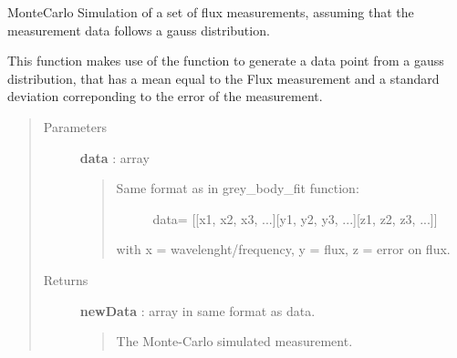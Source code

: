 \documentclass[a4paper,10pt,english]{sphinxmanual}
\begin{document}

\begin{fulllineitems}
\label{functions:astrolyze.functions.astro_functions.generate_monte_carlo_data_sed}
MonteCarlo Simulation of a set of flux measurements, assuming that the
measurement data follows a gauss distribution.

This function makes use of the  function to generate a
data point from a gauss distribution, that has a mean equal to the Flux
measurement and a standard deviation correponding to the error of the
measurement.
\begin{quote}\begin{description}
\item[{Parameters }] \leavevmode
\textbf{data} : array
\begin{quote}
\begin{description}
\item[{Same format as in grey\_body\_fit function:}] \leavevmode
data= {[}{[}x1, x2, x3, ...{]}{[}y1, y2, y3, ...{]}{[}z1, z2, z3, ...{]}{]}

\end{description}

with x = wavelenght/frequency, y = flux, z = error on flux.
\end{quote}

\item[{Returns }] \leavevmode
\textbf{newData} : array in same format as data.
\begin{quote}

The Monte-Carlo simulated measurement.
\end{quote}

\end{description}\end{quote}







\end{fulllineitems}

\end{document}
